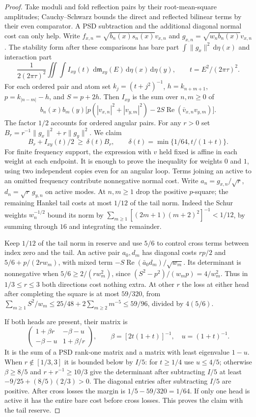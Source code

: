 \documentclass[11pt]{article}
\newcommand{\dd}{\,\mathrm{d}}
\begin{document}
\begin{proof}
Take moduli and fold reflection pairs by their root-mean-square amplitudes; Cauchy--Schwarz bounds the direct and reflected bilinear terms by their even comparator. A PSD subtraction and the additional diagonal normal cost can only help. Write $f_{x,n}=\sqrt{b_n(x)s_n(x)}v_{x,n}$ and $g_{x,n}=\sqrt{w_n b_n(x)}v_{x,n}$. The stability form after these comparisons has bare part $\int\|g_x\|^2\dd\eta(x)$ and interaction part
\[
 \frac{1}{2(2\pi\tau)^2}\iint\int I_{xy}(t)\,\dd\mathfrak m_{xy}(E)\dd\eta(x)\dd\eta(y),
 \qquad t=E^2/(2\pi\tau)^2 .
\]
For each ordered pair and atom set $k_j=(t+j^2)^{-1}$, $h=k_{n+m+1}$, $p=k_{|n-m|}-h$, and $S=p+2h$. Then $I_{xy}$ is the sum over $n,m\ge0$ of
\[
 b_n(x)b_m(y)\big[p(|v_{x,n}|^2+|v_{y,m}|^2)-2S\operatorname{Re}(\bar v_{x,n}v_{y,m})\big].
\]
The factor $1/2$ accounts for ordered angular pairs. For any $r>0$ set $B_r=r^{-1}\|g_x\|^2+r\|g_y\|^2$. We claim
\[
 B_r+I_{xy}(t)/2\ \ge\ \delta(t) B_r,\qquad
 \delta(t)=\min\{1/64,t/(1+t)\}.
\]
For finite frequency support, the expression with $v$ held fixed is affine in each weight at each endpoint. It is enough to prove the inequality for weights $0$ and $1$, using two independent copies even for an angular loop. Terms joining an active to an omitted frequency contribute nonnegative normal cost. Write $a_n=g_{x,n}/\sqrt r$, $d_n=\sqrt r\,g_{y,n}$ on active modes. At $n,m\ge1$ drop the positive $p$-square; the remaining Hankel tail costs at most $1/12$ of the tail norm. Indeed the Schur weights $w_n^{-1/2}$ bound its norm by $\sum_{m\ge1}[(2m+1)(m+2)^2]^{-1}<1/12$, by summing through $16$ and integrating the remainder.

Keep $1/12$ of the tail norm in reserve and use $5/6$ to control cross terms between index zero and the tail. An active pair $a_0,d_m$ has diagonal costs $rp/2$ and $5/6+p/(2rw_m)$, with mixed term $-S\operatorname{Re}(\bar a_0d_m)/\sqrt{w_m}$. Its determinant is nonnegative when $5/6\ge2/(rw_m^2)$, since $(S^2-p^2)/(w_mp)=4/w_m^2$. Thus in $1/3\le r\le3$ both directions cost nothing extra. At other $r$ the loss at either head after completing the square is at most $59/320$, from $\sum_{m\ge1}S^2/w_m\le25/48+2\sum_{m\ge2}m^{-5}\le59/96$, divided by $4(5/6)$.

If both heads are present, their matrix is
\[
 \begin{pmatrix}1+\beta r&-\beta-u\\-\beta-u&1+\beta/r\end{pmatrix},
 \qquad \beta=[2t(1+t)]^{-1},\quad u=(1+t)^{-1}.
\]
It is the sum of a PSD rank-one matrix and a matrix with least eigenvalue $1-u$. When $r\notin[1/3,3]$ it is bounded below by $I/5$: for $t\ge1/4$ use $u\le4/5$; otherwise $\beta\ge8/5$ and $r+r^{-1}\ge10/3$ give the determinant after subtracting $I/5$ at least $-9/25+(8/5)(2/3)>0$. The diagonal entries after subtracting $I/5$ are positive. After cross losses the margin is $1/5-59/320=1/64$. If only one head is active it has the entire bare cost before cross losses. This proves the claim with the tail reserve.


\end{proof}
\end{document}
